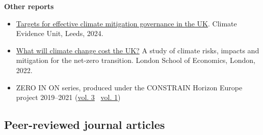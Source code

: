 \documentclass[11pt,a4paper,sans]{moderncv}
\begin{document}
\medskip\noindent\textbf{Other reports}\par\medskip
\begin{itemize}
\item \href{https://climate.leeds.ac.uk/wp-content/uploads/2024/06/Targets-for-effective-climate-mitigation-governance-in-the-UK-report-by-CEU.pdf}{Targets for effective climate mitigation governance in the UK}. Climate Evidence Unit, Leeds, 2024.
\item \href{https://www.lse.ac.uk/granthaminstitute/wp-content/uploads/2022/05/What-will-climate-change-cost-the-UK-risks-impacts-mitigation.pdf}{What will climate change cost the UK?} A study of climate risks, impacts and mitigation for the net-zero transition. London School of Economics, London, 2022.
\item ZERO IN ON series, produced under the CONSTRAIN Horizon Europe project 2019--2021 (\href{https://www.constrain-eu.org/wp-content/uploads/2021/11/Constrain-Zero-In-3-final.pdf}{vol. 3} \textbar\ \href{https://www.constrain-eu.org/wp-content/uploads/2020/02/CONSTRAIN-Zero-In-On-The-Remaining-Carbon-Budget-Decadal-Warming-Rates.pdf}{vol. 1})
\end{itemize}

\subsection{Peer-reviewed journal articles}

\begingroup
\sloppy

\endgroup
\end{document}
